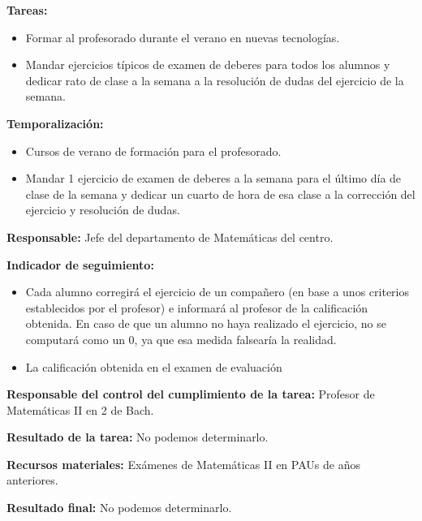 \textbf{Tareas:}
\vspace{-1cm}
\begin{itemize}
	\item Formar al profesorado durante el verano en nuevas tecnologías.
	\item Mandar ejercicios típicos de examen de deberes para todos los alumnos y dedicar rato de clase a la semana a la resolución de dudas del ejercicio de la semana.
\end{itemize}


\textbf{Temporalización:}
\vspace{-1cm}
\begin{itemize}
	\item Cursos de verano de formación para el profesorado.
	\item Mandar 1 ejercicio de examen de deberes a la semana para el último día de clase de la semana y dedicar un cuarto de hora de esa clase a la corrección del ejercicio y resolución de dudas.
\end{itemize}

\textbf{Responsable:}
Jefe del departamento de Matemáticas del centro.

\textbf{Indicador de seguimiento:}
\vspace{-1cm}
\begin{itemize}
	\item Cada alumno corregirá el ejercicio de un compañero (en base a unos criterios establecidos por el profesor) e informará al profesor de la calificación obtenida.
	\subitem En caso de que un alumno no haya realizado el ejercicio, no se computará como un 0, ya que esa medida falsearía la realidad.
	\item La calificación obtenida en el examen de evaluación 
\end{itemize}

\textbf{Responsable del control del cumplimiento de la tarea:}
Profesor de Matemáticas II en 2 de Bach.

\textbf{Resultado de la tarea:}
No podemos determinarlo.

\textbf{Recursos materiales:}
Exámenes de Matemáticas II en PAUs de años anteriores.

\textbf{Resultado final:}
No podemos determinarlo.